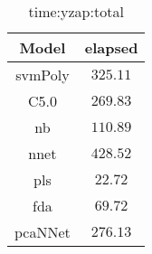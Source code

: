 \begin{table}[!ht]
	\centering
	\begin{tabular}{|c|c|}
		\hline
		Model & elapsed \\ \hline
		svmPoly & $325.11$ \\ \hline
		C5.0 & $269.83$ \\ \hline
		nb & $110.89$ \\ \hline
		nnet & $428.52$ \\ \hline
		pls & $22.72$ \\ \hline
		fda & $69.72$ \\ \hline
		pcaNNet & $276.13$ \\ \hline
	\end{tabular}
	\caption{time:yzap:total}
	\label{tab:time:yzap:total}
\end{table}
